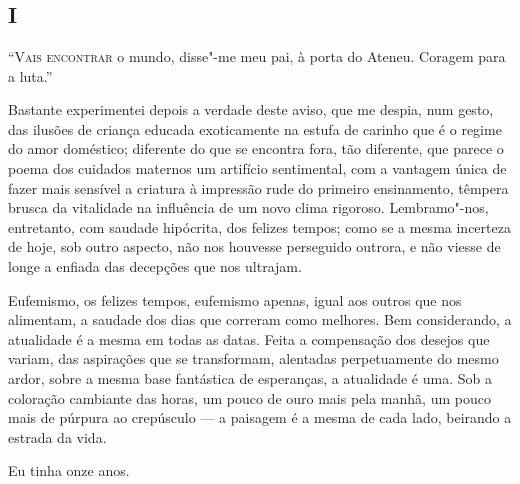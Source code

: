 

\chapter*{} %
\section{I}

\noindent\textsc{``Vais encontrar} o mundo, disse"-me meu pai, 
à porta do Ateneu. Coragem para a luta.'' 


Bastante experimentei depois a verdade deste aviso, que
me despia, num gesto, das ilusões de criança educada exoticamente na
estufa de carinho que é o regime do amor doméstico; diferente do que se
encontra fora, tão diferente, que parece o poema dos cuidados maternos
um artifício sentimental, com a vantagem única de fazer mais sensível a
criatura à impressão rude do primeiro ensinamento, têmpera brusca da
vitalidade na influência de um novo clima rigoroso. Lembramo"-nos,
entretanto, com saudade hipócrita, dos felizes tempos; como se a mesma
incerteza de hoje, sob outro aspecto, não nos houvesse perseguido
outrora, e não viesse de longe a enfiada das decepções que nos ultrajam. 

Eufemismo, os felizes tempos, eufemismo apenas, igual aos
outros que nos alimentam, a saudade dos dias que correram como
melhores. Bem considerando, a atualidade é a mesma em todas as datas.
Feita a compensação dos desejos que variam, das aspirações que se
transformam, alentadas perpetuamente do mesmo ardor, sobre a mesma base
fantástica de esperanças, a atualidade é uma. Sob a coloração cambiante
das horas, um pouco de ouro mais pela manhã, um pouco mais de púrpura
ao crepúsculo --- a paisagem é a mesma de cada lado, beirando a estrada
da vida. 

Eu tinha onze anos. 

